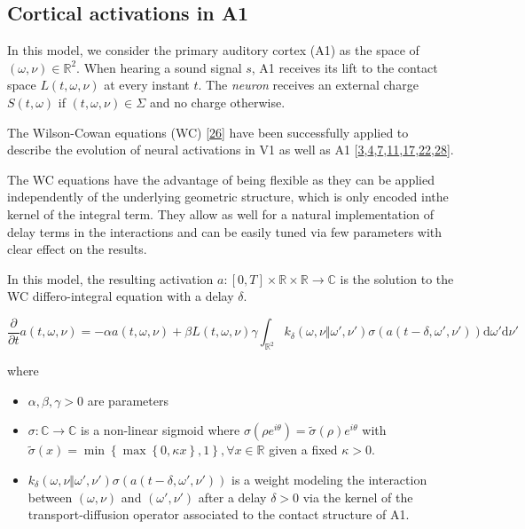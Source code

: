 \documentclass[american,]{article}
\providecommand{\tightlist}{%
  \setlength{\itemsep}{0pt}\setlength{\parskip}{0pt}}
\theoremstyle{definition}
\theoremstyle{definition}
\theoremstyle{definition}
\theoremstyle{remark}
\begin{document}
\hypertarget{cortical-activations-in-a1}{%
\subsection{Cortical activations in A1}\label{cortical-activations-in-a1}}

In this model, we consider the primary auditory cortex (A1) as the space of \((\omega,\nu)\in\mathbb{R}^2\).
When hearing a sound signal \(s\), A1 receives its lift to the contact space \(L(t,\omega,\nu)\)
at every instant \(t\).
The \emph{neuron} receives an external charge \(S(t,\omega)\) if \((t,\omega,\nu)\in\Sigma\) and no charge otherwise.

The Wilson-Cowan equations (WC) {[}\protect\hyperlink{ref-wilson1972}{26}{]} have been successfully applied to describe
the evolution of neural activations in V1 as well as A1
{[}\protect\hyperlink{ref-bertalmio2018}{3},\protect\hyperlink{ref-boscain2017}{4},\protect\hyperlink{ref-bressloff2002a}{7},\protect\hyperlink{ref-ermentrout1979}{11},\protect\hyperlink{ref-loebel2007}{17},\protect\hyperlink{ref-rankin2015}{22},\protect\hyperlink{ref-zulfiqar2019}{28}{]}.

The WC equations have the advantage of being flexible as they can be applied independently
of the underlying geometric structure, which is only encoded inthe kernel of the integral term.
They allow as well for a natural implementation of delay terms in the interactions
and can be easily tuned via few parameters with clear effect on the results.

In this model, the resulting activation \(a:[0,T]\times\mathbb{R}\times\mathbb{R}\rightarrow\mathbb{C}\) is the solution
to the WC differo-integral equation with a delay \(\delta\).

\begin{equation}
\frac{\partial}{\partial t}a(t,\omega,\nu) = -\alpha a(t,\omega,\nu) + \beta L(t,\omega,\nu)
\gamma\int_{\mathbb{R}^2} k_\delta(\omega,\nu\Vert\omega',\nu') \sigma(a(t-\delta,\omega',\nu')) \mathrm{d}\omega'\mathrm{d}\nu'
\end{equation}

where

\begin{itemize}
\tightlist
\item
  \(\alpha,\beta,\gamma>0\) are parameters
\item
  \(\sigma:\mathbb{C}\rightarrow\mathbb{C}\) is a non-linear sigmoid where \(\sigma(\rho e^{i\theta})=\tilde\sigma(\rho)e^{i\theta}\)
  with \(\tilde\sigma(x)=\min\left\{\max\left\{0,\kappa x\right\}, 1\right\},\forall x\in\mathbb{R}\) given a fixed \(\kappa>0\).
\item
  \(k_\delta(\omega,\nu\Vert\omega',\nu') \sigma(a(t-\delta,\omega',\nu'))\) is a weight modeling the interaction
  between \((\omega,\nu)\) and \((\omega',\nu')\) after a delay \(\delta>0\) via the kernel of the transport-diffusion
  operator associated to the contact structure of A1.
\end{itemize}
\end{document}
